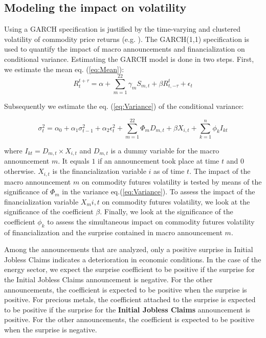 \documentclass[12pt]{article}
\begin{document}
\subsection{Modeling the impact on volatility}\label{variance}
Using a GARCH specification is justified by the time-varying and clustered volatility of commodity price returns (e.g. \citep{hammoudeh2008metal}).
The GARCH(1,1) specification is used to quantify the impact of macro announcements and financialization on conditional variance. Estimating the GARCH model is done in two steps. First, we estimate the mean eq. (\ref{eq:Mean}):
\begin{equation}\label{eq:Mean}R_{t}^{t+\tau}=\alpha+\sum_{m=1}^{22} \gamma_m S_{m,t}+\beta R_{t,-\tau}^{t}+\epsilon_{t}
\end{equation}

Subsequently we estimate the eq. (\ref{eq:Variance}) of the conditional variance:

\begin{equation}\label{eq:Variance}
\sigma_{t}^2=\alpha_0+\alpha_1 \sigma_{t-1}^2+\alpha_2 \epsilon_t^2 +\sum_{m=1}^{22} \Phi_m D_{m,t}+\beta X_{i,t}+\sum_{k=1}^n \phi_k I_{kt}
\end{equation}

where $I_{kt}=D_{m,t} \times X_{i,t}$ and $D_{m,t}$ is a dummy variable for the macro announcement $m$. It equals $1$ if an announcement took place at time $t$ and 0 otherwise. $X_{i,t}$  is the financialization variable $i$ as of time $t$. The impact of the macro announcement $m$ on commodity futures volatility is tested by means of the significance of $\Phi_m$ in the variance eq.(\ref{eq:Variance}). To assess the impact of the financialization variable $X_m{i,t}$ on commodity futures volatility, we look at the significance of the coefficient $\beta$. Finally, we look at the significance of the coefficient $\phi_k$ to assess the simultaneous impact on commodity futures volatility of  financialization  and the surprise contained in macro announcement $m$. 

Among the announcements that are analyzed, only a positive surprise in Initial Jobless Claims indicates a deterioration in economic conditions. In the case of the energy sector, we expect the surprise coefficient to be positive if the surprise for the Initial Jobless Claims announcement is negative. For the other announcements, the coefficient is expected to be positive when the surprise is positive. For precious metals, the coefficient attached to the surprise is expected to be positive if the surprise for the \textbf{Initial Jobless Claims} announcement is positive. For the other announcements, the coefficient is expected to be positive when the surprise is negative.
\end{document}
